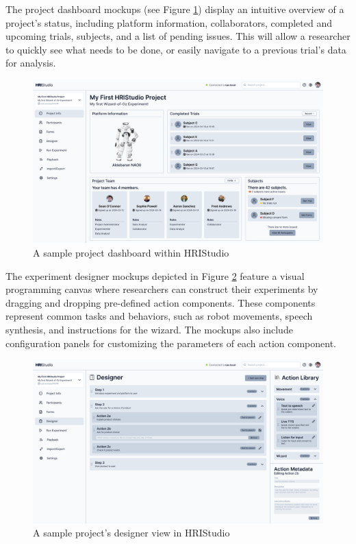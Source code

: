\documentclass[letterpaper, 10 pt, conference]{ieeeconf}
\begin{document}
The project dashboard mockups (see Figure \ref{dashboard}) display an intuitive overview of a project's status, including platform information, collaborators, completed and upcoming trials, subjects, and a list of pending issues. This will allow a researcher to quickly see what needs to be done, or easily navigate to a previous trial's data for analysis.

\begin{figure}[h]
    \begin{center}
        \includegraphics[width=0.4\paperwidth]{assets/mockups/projectdashboard}
        \vskip -0.3cm
        \caption{A sample project dashboard within HRIStudio}
        \label{dashboard}
    \end{center}
    \vskip -0.4cm
\end{figure}

The experiment designer mockups depicted in Figure \ref{designer} feature a visual programming canvas where researchers can construct their experiments by dragging and dropping pre-defined action components. These components represent common tasks and behaviors, such as robot movements, speech synthesis, and instructions for the wizard. The mockups also include configuration panels for customizing the parameters of each action component.

\begin{figure}[h]
    \begin{center}
        \includegraphics[width=0.4\paperwidth]{assets/mockups/experimentdesigner}
         \vskip -0.3cm
        \caption{A sample project's designer view in HRIStudio}
        \label{designer}
    \end{center}
    \vskip -0.5cm
\end{figure}
\end{document}
